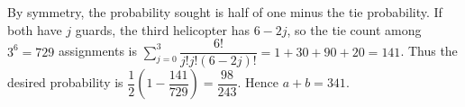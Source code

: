By symmetry, the probability sought is half of one minus the tie probability. If both have $j$ guards, the third helicopter has $6-2j$, so the tie count among $3^6=729$ assignments is $\sum_{j=0}^{3}\dfrac{6!}{j!j!(6-2j)!}=1+30+90+20=141$. Thus the desired probability is $\dfrac{1}{2}(1-\dfrac{141}{729})=\dfrac{98}{243}$. Hence $\boxed{a+b=341}$.
